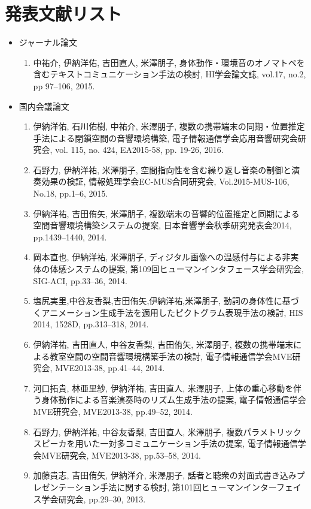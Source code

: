 \chapter*{発表文献リスト}

\begin{itemize}

  \item[] ジャーナル論文
  \begin{enumerate}
    \item 中祐介, 伊納洋佑, 吉田直人, 米澤朋子, 身体動作・環境音のオノマトペを含むテキストコミュニケーション手法の検討, HI学会論文誌, vol.17, no.2, pp 97--106, 2015.
  \end{enumerate}

\begin{comment}
  \item[] 国際会議論文
  \begin{enumerate}
    \item hoge
  \end{enumerate}
\end{comment}


  \item[] 国内会議論文
  \begin{enumerate}
    \item 伊納洋佑, 石川佑樹, 中祐介, 米澤朋子, 複数の携帯端末の同期・位置推定手法による閉鎖空間の音響環境構築, 電子情報通信学会応用音響研究会研究会, vol. 115, no. 424, EA2015-58, pp. 19-26,	2016.
    \item 石野力, 伊納洋祐, 米澤朋子, 空間指向性を含む繰り返し音楽の制御と演奏効果の検証, 情報処理学会EC-MUS合同研究会, Vol.2015-MUS-106, No.18, pp.1--6, 2015.
    \item 伊納洋祐, 吉田侑矢, 米澤朋子, 複数端末の音響的位置推定と同期による空間音響環境構築システムの提案, 日本音響学会秋季研究発表会2014, pp.1439--1440, 2014.
    \item 岡本直也, 伊納洋祐, 米澤朋子, ディジタル画像への温感付与による非実体の体感システムの提案, 第109回ヒューマンインタフェース学会研究会, SIG-ACI, pp.33--36, 2014.
    \item 塩尻実里,中谷友香梨,吉田侑矢,伊納洋祐,米澤朋子, 動詞の身体性に基づくアニメーション生成手法を適用したピクトグラム表現手法の検討, HIS 2014, 1528D, pp.313--318, 2014.
    \item 伊納洋祐, 吉田直人, 中谷友香梨, 吉田侑矢, 米澤朋子,	複数の携帯端末による教室空間の空間音響環境構築手法の検討,	電子情報通信学会MVE研究会,	MVE2013-38, pp.41--44,	2014.
    \item 河口拓貴, 林亜里紗, 伊納洋祐, 吉田直人, 米澤朋子, 上体の重心移動を伴う身体動作による音楽演奏時のリズム生成手法の提案, 電子情報通信学会MVE研究会, MVE2013-38, pp.49--52, 2014.
    \item 石野力, 伊納洋祐, 中谷友香梨, 吉田直人, 米澤朋子, 複数パラメトリックスピーカを用いた一対多コミュニケーション手法の提案, 電子情報通信学会MVE研究会, MVE2013-38, pp.53--58, 2014.
    \item 加藤貴志, 吉田侑矢, 伊納洋介, 米澤朋子, 話者と聴衆の対面式書き込みプレゼンテーション手法に関する検討, 第101回ヒューマンインターフェイス学会研究会, pp.29--30, 2013.
  \end{enumerate}


\end{itemize}
